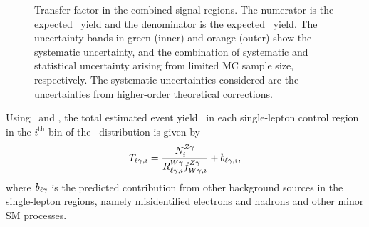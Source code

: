 \begin{figure}[htbp]
  \centering
  \caption{
    Transfer factor \fZW in the combined signal regions.
    The numerator is the expected \zinvg\ yield and the denominator is the expected \wlng\ yield.
    The uncertainty bands in green (inner) and orange (outer) show the systematic uncertainty, and the combination of systematic and statistical uncertainty arising from limited MC sample size, respectively. 
    The systematic uncertainties considered are the uncertainties from higher-order theoretical corrections.
  }
  \label{fig:tf_wz}
\end{figure}

Using \RWl\ and \fZW, the total estimated event yield \Tl\ in each single-lepton control region in the $i^\mathrm{th}$ bin of the \ETg\ distribution is given by
\begin{equation}
  \Tl[,i] = \frac{\NZg[i]}{\RWl[,i]\fZW[,i]} + b_{\ell\Pgg,i},
\end{equation}
where $b_{\ell\Pgg}$ is the predicted contribution from other background sources in the single-lepton regions, namely misidentified electrons and hadrons and other minor SM processes.

